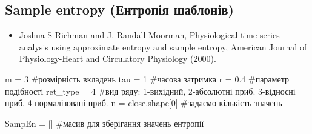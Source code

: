\documentclass[
  letterpaper,
]{report}
\newenvironment{Shaded}{\begin{snugshade}}{\end{snugshade}}
\newcommand{\CommentTok}[1]{\textcolor[rgb]{0.37,0.37,0.37}{#1}}
\newcommand{\DecValTok}[1]{\textcolor[rgb]{0.68,0.00,0.00}{#1}}
\newcommand{\FloatTok}[1]{\textcolor[rgb]{0.68,0.00,0.00}{#1}}
\newcommand{\NormalTok}[1]{\textcolor[rgb]{0.00,0.23,0.31}{#1}}
\newcommand{\OperatorTok}[1]{\textcolor[rgb]{0.37,0.37,0.37}{#1}}
\providecommand{\tightlist}{%
  \setlength{\itemsep}{0pt}\setlength{\parskip}{0pt}}\usepackage{longtable,booktabs,array}
\begin{document}
\hypertarget{sample-entropy-ux435ux43dux442ux440ux43eux43fux456ux44f-ux448ux430ux431ux43bux43eux43dux456ux432}{%
\subsection{Sample entropy (Ентропія
шаблонів)}\label{sample-entropy-ux435ux43dux442ux440ux43eux43fux456ux44f-ux448ux430ux431ux43bux43eux43dux456ux432}}

\begin{itemize}
\tightlist
\item
  Joshua S Richman and J. Randall Moorman, Physiological time-series
  analysis using approximate entropy and sample entropy, American
  Journal of Physiology-Heart and Circulatory Physiology (2000).
\end{itemize}

\begin{Shaded}
\begin{Highlighting}[]
\NormalTok{m }\OperatorTok{=} \DecValTok{3} \CommentTok{\#розмірність вкладень}
\NormalTok{tau }\OperatorTok{=} \DecValTok{1} \CommentTok{\#часова затримка}
\NormalTok{r }\OperatorTok{=} \FloatTok{0.4} \CommentTok{\#параметр подібності}
\NormalTok{ret\_type }\OperatorTok{=} \DecValTok{4} \CommentTok{\#вид ряду: 1{-}вихідний, 2{-}абсолютні приб. 3{-}відносні приб. 4{-}нормалізовані приб. }
\NormalTok{n }\OperatorTok{=}\NormalTok{ close.shape[}\DecValTok{0}\NormalTok{] }\CommentTok{\#задаємо кількість значень}

\NormalTok{SampEn }\OperatorTok{=}\NormalTok{ [] }\CommentTok{\#масив для зберігання значень ентропії}
\end{Highlighting}
\end{Shaded}
\end{document}
